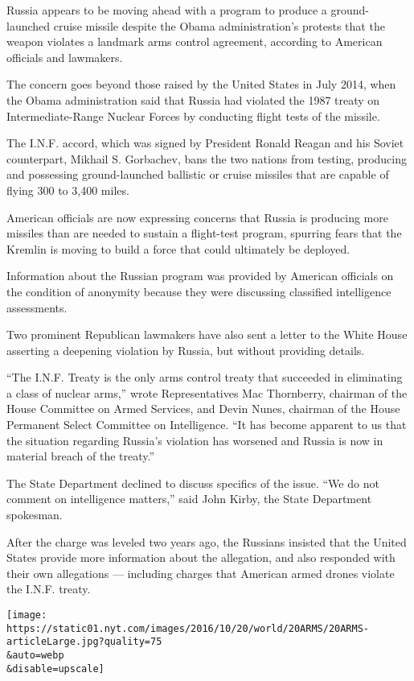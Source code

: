 Russia appears to be moving ahead with a program to produce a
ground-launched cruise missile despite the Obama administration's
protests that the weapon violates a landmark arms control agreement,
according to American officials and lawmakers.

The concern goes beyond those raised by the United States in July 2014,
when the Obama administration said that Russia had violated the 1987
treaty on Intermediate-Range Nuclear Forces by conducting flight tests
of the missile.

The I.N.F. accord, which was signed by President Ronald Reagan and his
Soviet counterpart, Mikhail S. Gorbachev, bans the two nations from
testing, producing and possessing ground-launched ballistic or cruise
missiles that are capable of flying 300 to 3,400 miles.

American officials are now expressing concerns that Russia is producing
more missiles than are needed to sustain a flight-test program, spurring
fears that the Kremlin is moving to build a force that could ultimately
be deployed.

Information about the Russian program was provided by American officials
on the condition of anonymity because they were discussing classified
intelligence assessments.

Two prominent Republican lawmakers have also sent a letter to the White
House asserting a deepening violation by Russia, but without providing
details.

``The I.N.F. Treaty is the only arms control treaty that succeeded in
eliminating a class of nuclear arms,'' wrote Representatives Mac
Thornberry, chairman of the House Committee on Armed Services, and Devin
Nunes, chairman of the House Permanent Select Committee on Intelligence.
``It has become apparent to us that the situation regarding Russia's
violation has worsened and Russia is now in material breach of the
treaty.''

The State Department declined to discuss specifics of the issue. ``We do
not comment on intelligence matters,'' said John Kirby, the State
Department spokesman.

After the charge was leveled two years ago, the Russians insisted that
the United States provide more information about the allegation, and
also responded with their own allegations --- including charges that
American armed drones violate the I.N.F. treaty.

\texttt{[image: https://static01.nyt.com/images/2016/10/20/world/20ARMS/20ARMS-articleLarge.jpg?quality=75\\\&auto=webp\\\&disable=upscale]}


